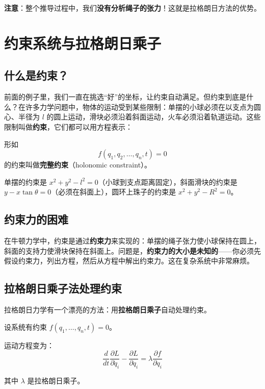 \textbf{注意}：整个推导过程中，我们\textbf{没有分析绳子的张力}！这就是拉格朗日方法的优势。

\section{约束系统与拉格朗日乘子}

\subsection{什么是约束？}

前面的例子里，我们一直在挑选“好”的坐标，让约束自动满足。但约束到底是什么？在许多力学问题中，物体的运动受到某些限制：单摆的小球必须在以支点为圆心、半径为 $l$ 的圆上运动，滑块必须沿着斜面运动，火车必须沿着轨道运动。这些限制叫做\textbf{约束}，它们都可以用方程表示：

\begin{definition}[完整约束]
形如
\[
f(q_1, q_2, \ldots, q_n, t) = 0
\]
的约束叫做\textbf{完整约束}（holonomic constraint）。
\end{definition}

\begin{example}[约束的例子]
单摆的约束是 $x^2 + y^2 - l^2 = 0$（小球到支点距离固定），斜面滑块的约束是 $y - x\tan\theta = 0$（必须在斜面上），圆环上珠子的约束是 $x^2 + y^2 - R^2 = 0$。
\end{example}

\subsection{约束力的困难}

在牛顿力学中，约束是通过\textbf{约束力}来实现的：单摆的绳子张力使小球保持在圆上，斜面的支持力使滑块保持在斜面上。问题是，\textbf{约束力的大小是未知的}——你必须先假设约束力，列出方程，然后从方程中解出约束力。这在复杂系统中非常麻烦。

\subsection{拉格朗日乘子法处理约束}

拉格朗日力学有一个漂亮的方法：用\textbf{拉格朗日乘子}自动处理约束。

\begin{keyformula}[title=带约束的拉格朗日方程]
设系统有约束 $f(q_1, \ldots, q_n, t) = 0$。

运动方程变为：
\begin{equation}
\boxed{\frac{d}{dt}\frac{\partial L}{\partial \dot{q}_i} - \frac{\partial L}{\partial q_i} = \lambda \frac{\partial f}{\partial q_i}}
\end{equation}

其中 $\lambda$ 是拉格朗日乘子。
\end{keyformula}

